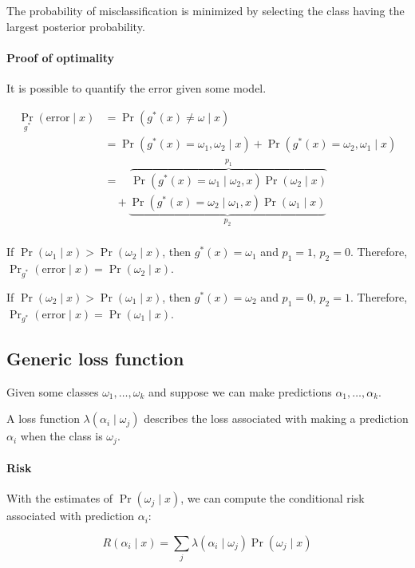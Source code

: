 \documentclass{idc_msc}
\begin{document}
The probability of misclassification is minimized by selecting the class having the largest posterior probability.

\paragraph{Proof of optimality}

It is possible to quantify the error given some model.

\[
\begin{aligned}
\Pr_{g^*}(\text{error} \mid x)
&= \Pr(g^*(x) \ne \omega \mid x) \\
&= \Pr(g^*(x) = \omega_1,\omega_2 \mid x) + \Pr(g^*(x) = \omega_2,\omega_1 \mid x) \\
&= \quad\overbrace{\Pr(g^*(x) = \omega_1 \mid \omega_2, x)\Pr(\omega_2 \mid x)}^{p_1} \\
&\quad+ \underbrace{\Pr(g^*(x) = \omega_2 \mid \omega_1, x)\Pr(\omega_1 \mid x)}_{p_2} \\
\end{aligned}
\]

If \(\Pr(\omega_1 \mid x) > \Pr(\omega_2 \mid x)\), then \(g^*(x) = \omega_1\) and \(p_1=1\), \(p_2 = 0\).
Therefore, \(\Pr_{g^*}(\text{error} \mid x) = \Pr(\omega_2 \mid x)\).

If \(\Pr(\omega_2 \mid x) > \Pr(\omega_1 \mid x)\), then \(g^*(x) = \omega_2\) and \(p_1=0\), \(p_2 = 1\).
Therefore, \(\Pr_{g^*}(\text{error} \mid x) = \Pr(\omega_1 \mid x)\).

\subsection{Generic loss function}

Given some classes \(\omega_1,\ldots,\omega_k\) and suppose we can make predictions \(\alpha_1, \ldots, \alpha_k\).

A loss function \(\lambda(\alpha_i \mid \omega_j)\) describes the loss associated with making a prediction \(\alpha_i\) when the class is \(\omega_j\).

\paragraph{Risk}

With the estimates of \(\Pr(\omega_j \mid x)\), we can compute the conditional risk associated with prediction \(\alpha_i\):

\[R(\alpha_i \mid x) = \sum_j \lambda(\alpha_i \mid \omega_j) \Pr(\omega_j \mid x)\]
\end{document}
